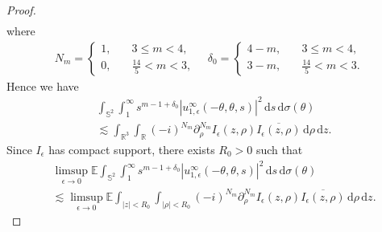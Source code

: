 \documentclass[reqno, 12pt]{amsart}
\numberwithin{equation}{section}
\begin{document}
\begin{proof}
\begin{align*}
\end{align*} where \begin{align*}
	N_m= \begin{cases}
		1, &\quad 3 \le m  < 4, \\   0, &\quad \frac{14}{5} < m  < 3,
	\end{cases}\quad \delta_0=\begin{cases}
		4-m, &\quad 3 \le m  < 4, \\   3-m, &\quad \frac{14}{5} < m  < 3.
	\end{cases}
\end{align*} Hence we have \begin{align*}
	&\int_{\mathbb{S}^2}\int_1^\infty s^{m-1+\delta_0} |u^\infty_{1, \epsilon}(-\theta,\theta,s)|^2\,\mathrm{d}s\,\mathrm{d}\sigma(\theta) \\ &\lesssim\int_{\mathbb R^3}\int_{\mathbb R}(-i)^{N_m}\partial_\rho^{N_m} I_\epsilon(z,\rho)\overline{I_\epsilon(z,\rho)}\,\mathrm{d}\rho\,\mathrm{d}z.
\end{align*} Since $I_\epsilon$ has compact support,  there exists $R_0>0$ such that \begin{align*}
	&\limsup_{\epsilon \to 0} \mathbb E \int_{\mathbb{S}^2}\int_1^\infty s^{m-1+\delta_0}|u^\infty_{1, \epsilon}(-\theta,\theta,s)|^2\,\mathrm{d}s\,\mathrm{d}\sigma(\theta) \\ &\lesssim \limsup_{\epsilon \to 0} \mathbb E \int_{|z|<R_0} \int_{|\rho|<R_0} (-i)^{N_m}\partial_\rho^{N_m} I_\epsilon(z,\rho)\overline{I_\epsilon(z,\rho)} \,\mathrm{d}\rho\,\mathrm{d}z. 
\end{align*}


\end{proof}
\end{document}
